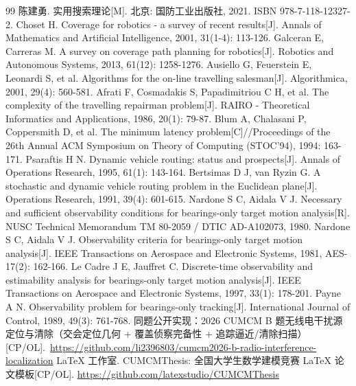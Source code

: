 \begin{thebibliography}{99}
 陈建勇. 实用搜索理论[M]. 北京: 国防工业出版社, 2021. ISBN 978-7-118-12327-2.
 Choset H. Coverage for robotics - a survey of recent results[J]. Annals of Mathematics and Artificial Intelligence, 2001, 31(1-4): 113-126.
 Galceran E, Carreras M. A survey on coverage path planning for robotics[J]. Robotics and Autonomous Systems, 2013, 61(12): 1258-1276.
 Ausiello G, Feuerstein E, Leonardi S, et al. Algorithms for the on-line travelling salesman[J]. Algorithmica, 2001, 29(4): 560-581.
 Afrati F, Cosmadakis S, Papadimitriou C H, et al. The complexity of the travelling repairman problem[J]. RAIRO - Theoretical Informatics and Applications, 1986, 20(1): 79-87.
 Blum A, Chalasani P, Coppersmith D, et al. The minimum latency problem[C]//Proceedings of the 26th Annual ACM Symposium on Theory of Computing (STOC'94), 1994: 163-171.
 Psaraftis H N. Dynamic vehicle routing: status and prospects[J]. Annals of Operations Research, 1995, 61(1): 143-164.
 Bertsimas D J, van Ryzin G. A stochastic and dynamic vehicle routing problem in the Euclidean plane[J]. Operations Research, 1991, 39(4): 601-615.
 Nardone S C, Aidala V J. Necessary and sufficient observability conditions for bearings-only target motion analysis[R]. NUSC Technical Memorandum TM 80-2059 / DTIC AD-A102073, 1980.
 Nardone S C, Aidala V J. Observability criteria for bearings-only target motion analysis[J]. IEEE Transactions on Aerospace and Electronic Systems, 1981, AES-17(2): 162-166.
 Le Cadre J E, Jauffret C. Discrete-time observability and estimability analysis for bearings-only target motion analysis[J]. IEEE Transactions on Aerospace and Electronic Systems, 1997, 33(1): 178-201.
 Payne A N. Observability problem for bearings-only tracking[J]. International Journal of Control, 1989, 49(3): 761-768.
 同题公开实现：2026 CUMCM B 题无线电干扰源定位与清除（交会定位几何 + 覆盖侦察完备性 + 追踪逼近/清除扫描）[CP/OL].\
\url{https://github.com/li2396803/cumcm2026-b-radio-interference-localization}
\bibitem{cumcmthesis} LaTeX 工作室. CUMCMThesis: 全国大学生数学建模竞赛 LaTeX 论文模板[CP/OL]. \url{https://github.com/latexstudio/CUMCMThesis}
\end{thebibliography}
